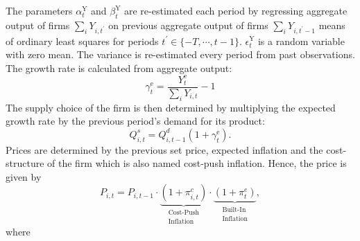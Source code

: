 The parameters $\alpha_{t}^{\mathrm{Y}}$ and $\beta_{t}^{\mathrm{Y}}$ are re-estimated each period by regressing aggregate output of firms $\sum_i Y_{i,t^\prime}$ on previous aggregate output of firms $\sum_i Y_{i,t^\prime-1}$ means of ordinary least squares for periods $t^\prime \in \{-T,\cdots,t-1\}$. $\epsilon_{t}^{\mathrm{Y}}$ is a random variable with zero mean. The variance is re-estimated every period from past observations. The growth rate is calculated from aggregate output:
\begin{equation}
\gamma_t^{\mathrm{e}}=\frac{Y_t^{\mathrm{e}} }{\sum_i Y_{i,t}}-1
\end{equation}
The supply choice of the firm is then determined by multiplying the expected growth rate by the previous period's demand for its product:
\begin{equation}
Q_{i,t}^s = Q_{i,t-1}^d(1+\gamma_t^{\mathrm{e}} ).
\end{equation}
Prices are determined by the previous set price, expected inflation and the cost-structure of the firm which is also named cost-push inflation. Hence, the price is given by
\begin{equation}
P_{i,t}=P_{i,t-1} \cdot \underbrace{\left(1+\pi_{i,t}^c\right)}_{\begin{array}{c}
\text { Cost-Push } \\
\text { Inflation }
\end{array}} \cdot \underbrace{\left(1+\pi_t^e\right)}_{\begin{array}{c}
\text { Built-In } \\
\text { Inflation }
\end{array}},
\end{equation}
where


